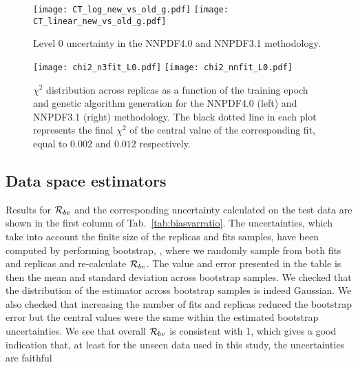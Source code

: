 \begin{figure*}[h]
    \centering
    \texttt{[image: CT\_log\_new\_vs\_old\_g.pdf]}
    \texttt{[image: CT\_linear\_new\_vs\_old\_g.pdf]}
    \caption{Level 0 uncertainty in the NNPDF4.0 and NNPDF3.1 methodology.}
    \label{fig:CT_uncertainty_new_vs_old}    
\end{figure*}

\begin{figure*}[h]
    \centering
    \texttt{[image: chi2\_n3fit\_L0.pdf]}
    \texttt{[image: chi2\_nnfit\_L0.pdf]}
    \caption{$\chi^2$ distribution across replicas as a function of the training
    epoch and genetic algorithm generation for the NNPDF4.0 (left) and NNPDF3.1
    (right) methodology. The black dotted line
    in each plot represents the final $\chi^2$ of the central value of the
    corresponding fit, equal to $0.002$ and $0.012$ respectively.}
    \label{fig:chi2_vs_epoch}    
\end{figure*}



\subsection{Data space estimators}

Results for $\mathcal{R}_{bv}$ and the corresponding uncertainty calculated on the
test data are shown in the first column of Tab.~\ref{tab:biasvarratio}.
The uncertainties, which take into account the finite size of the replicas and fits samples,
have been computed by performing bootstrap, 
\cite{efron1994introduction}, where we randomly sample from both fits and
replicas and re-calculate $\mathcal{R}_{bv}$. The value and error presented in the
table is then the mean and standard deviation across bootstrap samples. We
checked that the distribution of the estimator across bootstrap samples is
indeed Gaussian. We also checked that increasing the number of fits and replicas
reduced the bootstrap error but the central values were the same within the
estimated bootstrap uncertainties. We see that overall $\mathcal{R}_{bv}$  is
consistent with 1, which gives a good indication that, at least for the unseen
data used in this study, the uncertainties are faithful


